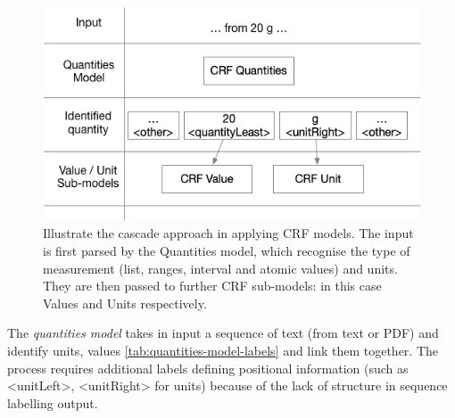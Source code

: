 \documentclass[sigconf]{acmart}
\begin{document}
\begin{figure}[ht]
  \centering
  \includegraphics[width=\linewidth]{images/schema-cascade}
  \caption{Illustrate the cascade approach in applying CRF models. The input is first parsed by the Quantities model, which recognise the type of measurement (list, ranges, interval and atomic values) and units. They are then passed to further CRF sub-models: in this case Values and Units respectively.}
  \label{fig:schema-cascade}
\end{figure}

The \textit{quantities model} takes in input a sequence of text (from text or PDF) and  identify units, values \ref{tab:quantities-model-labels} and link them together. The process requires additional labels defining positional information (such as <unitLeft>, <unitRight> for units) because of the lack of structure in sequence labelling output. 
\end{document}
